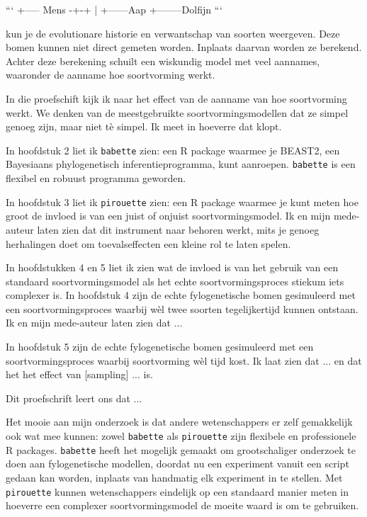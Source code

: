 {```
   +----- Mens
-+-+
 | +------Aap
 +--------Dolfijn
```

kun je de evolutionare historie en verwantschap van soorten weergeven.
Deze bomen kunnen niet direct gemeten worden. Inplaats daarvan
worden ze berekend. Achter deze berekening schuilt een wiskundig model
met veel aannames, waaronder de aanname hoe soortvorming werkt.

In die proefschift kijk ik naar het effect van de aanname van hoe soortvorming
werkt. We denken van de meestgebruikte soortvormingsmodellen dat ze simpel
genoeg zijn, maar niet tè simpel. Ik meet in hoeverre dat klopt.



In hoofdstuk 2 liet ik \verb;babette; zien: een R package waarmee je BEAST2, 
een Bayesiaans phylogenetisch inferentieprogramma, kunt aanroepen. 
\verb;babette; is een flexibel en robuust programma geworden.



In hoofdstuk 3 liet ik \verb;pirouette; zien: een R package waarmee
je kunt meten hoe groot de invloed is van een juist of onjuist 
soortvormingsmodel. Ik en mijn mede-auteur laten zien dat dit instrument naar behoren werkt, mits
je genoeg herhalingen doet om toevalseffecten een kleine rol te laten spelen.

In hoofdstukken 4 en 5 liet ik zien wat de invloed is van het gebruik van een standaard 
soortvormingsmodel als het echte soortvormingsproces stiekum iets complexer is.
In hoofdstuk 4 zijn de echte fylogenetische bomen gesimuleerd met een 
soortvormingsproces waarbij wèl twee soorten tegelijkertijd kunnen ontstaan.
Ik en mijn mede-auteur laten zien dat ...

In hoofdstuk 5 zijn de echte fylogenetische bomen gesimuleerd met een 
soortvormingsproces waarbij soortvorming wèl tijd kost. Ik laat zien
dat ... en dat het het effect van [sampling] ... is.  


Dit proefschrift leert ons dat ...

Het mooie aan mijn onderzoek is dat andere wetenschappers er zelf gemakkelijk 
ook wat mee kunnen:
zowel \verb;babette; als \verb;pirouette; zijn flexibele en professionele 
R packages. \verb;babette; heeft het mogelijk gemaakt om grootschaliger 
onderzoek te doen aan fylogenetische modellen, doordat nu een experiment
vanuit een script gedaan kan worden, inplaats van handmatig elk 
experiment in te stellen. Met \verb;pirouette; kunnen wetenschappers 
eindelijk op een standaard manier meten in hoeverre een complexer 
soortvormingsmodel de moeite waard is om te gebruiken. 

} %
